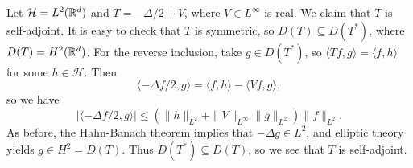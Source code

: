 \begin{example}
  Let $\mathcal{H} = L^2(\mathbb{R}^d)$ and
  $T = - \Delta / 2 + V$, where $V \in L^\infty$ is
  real. We claim that $T$ is self-adjoint. It is easy to check
  that $T$ is symmetric, so $D(T) \subseteq D(T^*)$,
  where $D(T) = H^2(\mathbb{R}^d)$. For the reverse inclusion,
  take $g \in D(T^*)$, so $\langle Tf, g \rangle = \langle f, h \rangle$
  for some $h \in \mathcal{H}$. Then
  \[
    \langle -\Delta f / 2, g \rangle
    = \langle f, h \rangle - \langle Vf, g \rangle,
  \]
  so we have
  \[
    | \langle - \Delta f / 2, g \rangle | 
    \le (\| h \|_{L^2} + \| V \|_{L^\infty}\| g \|_{L^2}) \| f \|_{L^2}.
  \]
  As before, the Hahn-Banach theorem implies that
  $-\Delta g \in L^2$, and elliptic theory yields
  $g \in H^2 = D(T)$. Thus $D(T^*) \subseteq D(T)$, so
  we see that $T$ is self-adjoint.
\end{example}

